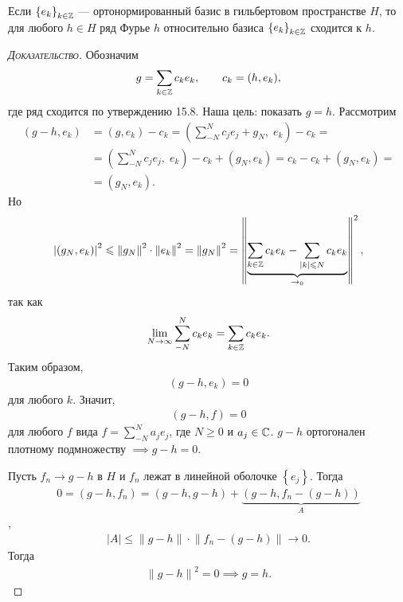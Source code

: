 \documentclass[../complex-analysis.tex]{subfiles}
\begin{document}
\begin{thm}
 Если $ \left\{e_k\right\}_{k \in \mathbb{Z}}  $ --- ортонормированный базис в гильбертовом пространстве $ H $, то для любого $ h \in H$ ряд Фурье $ h $ относительно базиса $ \left\{e_k\right\}_{k\in\mathbb{Z}}  $ сходится к $ h $.
\end{thm}
\begin{proof}[\normalfont\textsc{Доказательство}]
 Обозначим
 \begin{align*}
  g = \sum_{k\in\mathbb{Z}}c_ke_k,\qquad c_k=(h,e_k),
 \end{align*} где ряд сходится по утверждению 15.8. Наша цель: показать $ g=h $. Рассмотрим
 \begin{align*}
  (g-h,e_k) &= (g,e_k) - c_k = \left(\sum_{-N}^{N}c_je_j + g_N,\; e_k \right) - c_k = \\
  &= \left( \sum_{-N}^{N}c_je_j,\;e_k \right) - c_k + (g_N,e_k) = c_k - c_k + (g_N,e_k) = \\
  &= (g_N,e_k).
 \end{align*} Но
 \begin{align*}
  \left| (g_N,e_k) \right|^{2} \leqslant \left\| g_N \right\|^{2} \cdot \left\| e_k \right\|^{2} = \left\| g_N \right\|^{2} = \left\| \underbrace{\sum_{k\in\mathbb{Z}}c_ke_k - \sum_{\left| k \right| \leqslant N} c_ke_k}_{\to_0} \right\|^{2},
 \end{align*} так как
 \begin{align*}
  \lim_{N \to \infty} \sum_{-N}^{N}c_ke_k = \sum_{k\in\mathbb{Z}}c_ke_k.
 \end{align*} Таким образом,
 \begin{align*}
  (g-h,e_k) = 0
 \end{align*} для любого $ k $. Значит,
 \begin{align*}
  (g-h,f) = 0
 \end{align*} для любого $ f $ вида $ f = \sum_{-N}^{N}a_je_j$, где $ N\geqslant 0 $ и $ a_j \in \mathbb{C} $. $ g-h $ ортогонален плотному подмножеству $ \implies g-h=0 $.

 Пусть $ f_n \to g-h $ в $ H $ и $ f_n $ лежат в линейной оболочке $ \left\{e_j\right\} $. Тогда
 \begin{align*}
  0 = (g-h,f_n) = (g-h,g-h) + \underbrace{(g-h,f_n - (g-h))}_A
 \end{align*}, 
 \begin{align*}
  \left| A \right| \leqslant \left\| g-h \right\| \cdot \left\| f_n - (g-h) \right\| \to 0.
 \end{align*} Тогда
 \begin{align*}
  \left\| g-h \right\|^{2} = 0 \implies g = h.
 \end{align*}
\end{proof}
\end{document}
